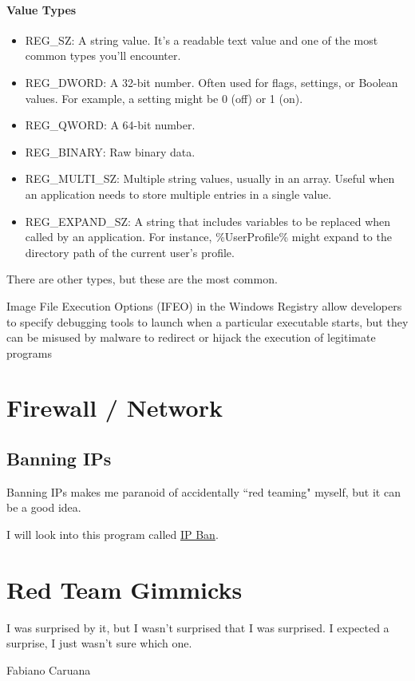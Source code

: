 \documentclass{article}
\begin{document}
\paragraph{Value Types}
\begin{itemize}
\item REG\_SZ: A string value. It's a readable text value and one of the most common types
 you'll encounter.

\item REG\_DWORD: A 32-bit number. Often used for flags, settings, or Boolean values. 
For example, a setting might be 0 (off) or 1 (on).

\item REG\_QWORD: A 64-bit number.

\item REG\_BINARY: Raw binary data.

\item REG\_MULTI\_SZ: Multiple string values, usually in an array. 
Useful when an application needs to store multiple entries in a single value.

\item REG\_EXPAND\_SZ: A string that includes variables to be replaced when called by an application. 
For instance, \%UserProfile\% might expand to the directory path of the current user's profile.
\end{itemize}
There are other types, but these are the most common.

Image File Execution Options (IFEO) in the Windows Registry allow 
developers to specify debugging tools to launch when a particular 
executable starts, but they can be misused by malware to redirect 
or hijack the execution of legitimate programs

\section{Firewall / Network}
\subsection{Banning IPs}
Banning IPs makes me paranoid of accidentally ``red teaming" myself, but it can be a good idea.

I will look into this program called \href{https://github.com/DigitalRuby/IPBan}{IP Ban}.

\section{Red Team Gimmicks}
\epigraph{I was surprised by it, but I wasn’t surprised that I was surprised. I expected a surprise, I just wasn’t sure which one.}
{Fabiano Caruana}
\end{document}
